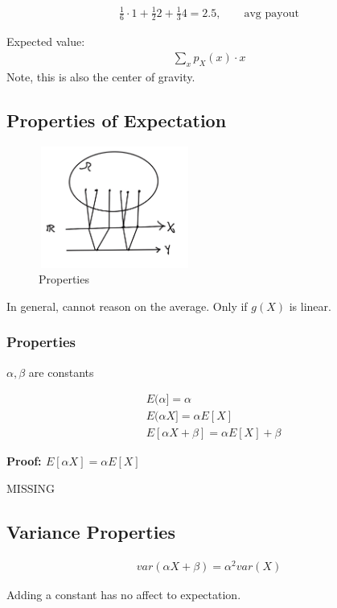 \begin{align*}
\frac{1}{6}\cdot 1 + \frac{1}{2}2 + \frac{1}{3}4 = 2.5, \qquad \text{avg payout}
\end{align*}

Expected value:
\begin{align*}
\sum_x p_X(x) \cdot x
\end{align*}
Note, this is also the center of gravity.

\subsection{Properties of Expectation}


\begin{figure}[ht]
\centering
\includegraphics[width=5cm, height=4cm]{images/L05/EX_properties.jpeg}
\caption{Properties}
\end{figure}

 In general, cannot reason on the average.  Only if $g(X)$ is linear.


\subsubsection{Properties}
$\alpha, \beta$ are constants

\begin{align}
&E(\alpha] = \alpha\\
&E(\alpha X] = \alpha E[X]\\
&E[\alpha X + \beta] = \alpha E[X] + \beta
\end{align}

\textbf{Proof: $E[\alpha X]= \alpha E[X]$}

MISSING

\subsection{Variance Properties}


\begin{align}
var(\alpha X + \beta) = \alpha^2 var(X)
\end{align}

Adding a constant has no affect to expectation.